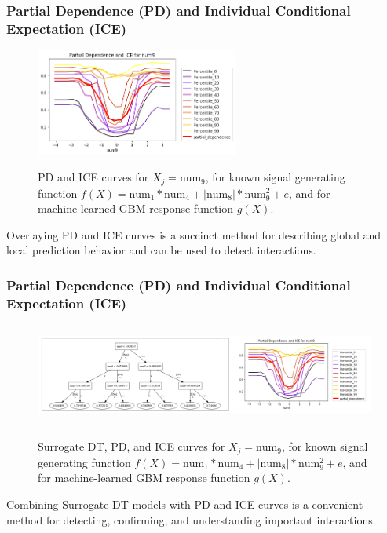 \documentclass[11pt, 
               aspectratio=169
               ]{beamer}
\begin{document}
		\begin{frame}
		
			\vspace{-10pt}
		
			\frametitle{Partial Dependence (PD) and Individual Conditional Expectation (ICE)}
		
			\begin{figure}[htb]
				\begin{center}
					\includegraphics[height=100pt]{img/pdp_ice.png}
					\label{fig:pdp_ice}
					\caption{PD and ICE curves for $ X_j = \text{num}_9$, for known signal generating function $f(X) = \text{num} _1 * \text{num}_4 + |\text{num}_8| * \text{num}_9^2 + e$, and for machine-learned GBM response function $g(X)$.}
				\end{center}
			\end{figure}
			
			\vspace{-10pt}
			
			Overlaying PD and ICE curves is a succinct method for describing global and local prediction behavior and can be used to detect interactions. \cite{ice_plots} 
			
		\end{frame}
	
		\begin{frame}
	
			\frametitle{Partial Dependence (PD) and Individual Conditional Expectation (ICE)}
	
				\vspace{-20pt}
				
				\begin{figure}[htb]
					\begin{center}
						\label{fig:dt_surrogate_pdp_ice}
						\includegraphics[height=95pt]{img/dt_surrogate2_pdp_ice2.png}
						\caption{Surrogate DT, PD, and ICE curves for $ X_j = \text{num}_9$, for known signal generating function $f(X) = \text{num} _1 * \text{num}_4 + |\text{num}_8| * \text{num}_9^2 + e$, and for machine-learned GBM response function $g(X)$.}
					\end{center}
				\end{figure}
			
				Combining Surrogate DT models with PD and ICE curves is a convenient method for detecting, confirming, and understanding important interactions. 
	
		\end{frame}
\end{document}
